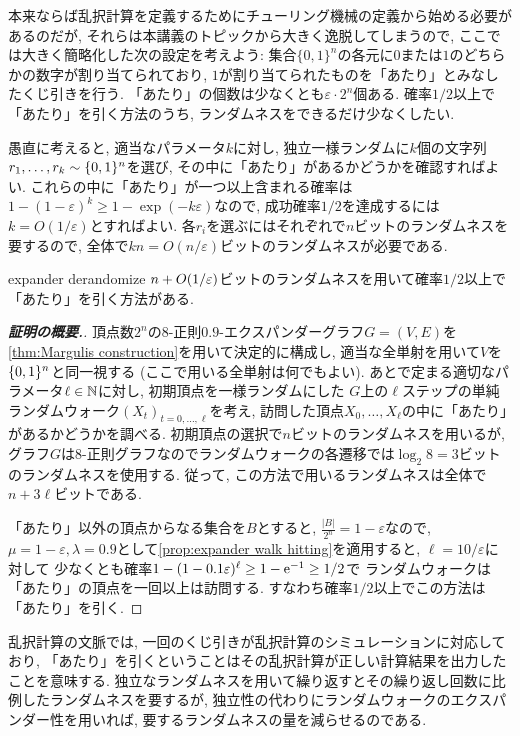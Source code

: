 本来ならば乱択計算を定義するためにチューリング機械の定義から始める必要があるのだが,
それらは本講義のトピックから大きく逸脱してしまうので,
ここでは大きく簡略化した次の設定を考えよう:
集合$\{0,1\}^n$の各元に$0$または$1$のどちらかの数字が割り当てられており, $1$が割り当てられたものを「あたり」とみなしたくじ引きを行う.
「あたり」の個数は少なくとも$\varepsilon\cdot 2^n$個ある.
確率$1/2$以上で「あたり」を引く方法のうち, ランダムネスをできるだけ少なくしたい.



愚直に考えると, 適当なパラメータ$k$に対し,
独立一様ランダムに$k$個の文字列$r_1,\dots,r_k\sim\{0,1\}^n$を選び, その中に「あたり」があるかどうかを確認すればよい.
これらの中に「あたり」が一つ以上含まれる確率は$1-(1-\varepsilon)^k \ge 1-\exp(-k\varepsilon)$なので, 成功確率$1/2$を達成するには$k=O(1/\varepsilon)$とすればよい.
各$r_i$を選ぶにはそれぞれで$n$ビットのランダムネスを要するので, 全体で$kn = O(n/\varepsilon)$ビットのランダムネスが必要である.

\begin{proposition}{}{expander derandomize}
    $n + O\rbra*{1/\varepsilon}$ビットのランダムネスを用いて確率$1/2$以上で「あたり」を引く方法がある.
\end{proposition}
\begin{proof}[\textbf{証明の概要.}]
    頂点数$2^n$の$8$-正則$0.9$-エクスパンダーグラフ$G=(V,E)$を\cref{thm:Margulis construction}を用いて決定的に構成し, 適当な全単射を用いて$V$を$\{0,1\}^n$と同一視する (ここで用いる全単射は何でもよい).
    あとで定まる適切なパラメータ$\ell\in\mathbb{N}$に対し,
    初期頂点を一様ランダムにした
    $G$上の$\ell$ステップの単純ランダムウォーク$(X_t)_{t=0,\dots,\ell}$を考え,
    訪問した頂点$X_0,\dots,X_\ell$の中に「あたり」があるかどうかを調べる.
    初期頂点の選択で$n$ビットのランダムネスを用いるが,
    グラフ$G$は$8$-正則グラフなのでランダムウォークの各遷移では$\log_2 8=3$ビットのランダムネスを使用する.
    従って, この方法で用いるランダムネスは全体で$n + 3\ell$ビットである.

    「あたり」以外の頂点からなる集合を$B$とすると, $\frac{|B|}{2^n} = 1-\varepsilon$なので,
    $\mu = 1-\varepsilon, \lambda=0.9$として\cref{prop:expander walk hitting}を適用すると,
    $\ell=10/\varepsilon$に対して
    少なくとも確率$1-(1-0.1\varepsilon)^\ell \ge 1-\mathrm{e}^{-1} \ge 1/2$で
    ランダムウォークは「あたり」の頂点を一回以上は訪問する.
    すなわち確率$1/2$以上でこの方法は「あたり」を引く.
\end{proof}

乱択計算の文脈では, 一回のくじ引きが乱択計算のシミュレーションに対応しており,
「あたり」を引くということはその乱択計算が正しい計算結果を出力したことを意味する.
独立なランダムネスを用いて繰り返すとその繰り返し回数に比例したランダムネスを要するが,
独立性の代わりにランダムウォークのエクスパンダー性を用いれば, 要するランダムネスの量を減らせるのである.


